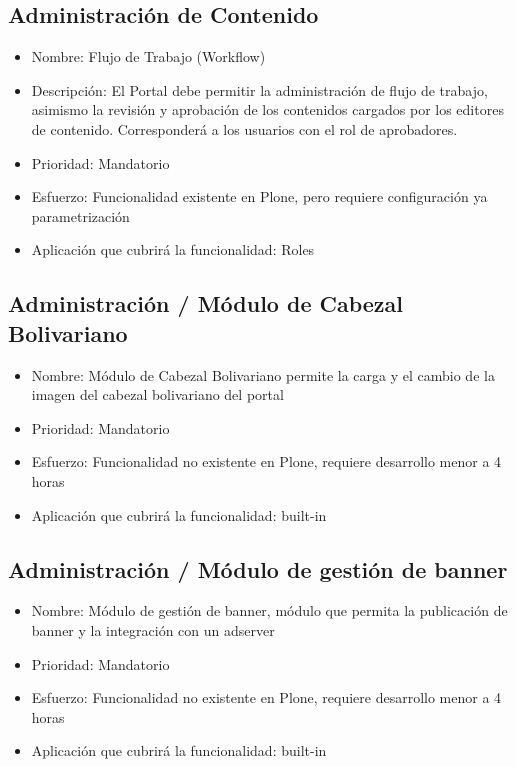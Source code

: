 \documentclass[11pt, letterpaper, oneside, spanish]{scrbook}
\begin{document}
\subsection{Administración de Contenido}
\label{sec-2-1-12}

\begin{itemize}
\item Nombre: Flujo de Trabajo (Workflow)
\item Descripción: El Portal debe permitir la administración de flujo de trabajo,
  asimismo la revisión y aprobación de los contenidos cargados por los
  editores de contenido. Corresponderá a los usuarios con el rol de
  aprobadores.
\item Prioridad: Mandatorio
\item Esfuerzo: Funcionalidad existente en Plone, pero requiere configuración ya
  parametrización
\item Aplicación que cubrirá la funcionalidad: Roles
\end{itemize}
\subsection{Administración / Módulo de Cabezal Bolivariano}
\label{sec-2-1-13}

\begin{itemize}
\item Nombre: Módulo de Cabezal Bolivariano permite la carga y el cambio de la
  imagen del cabezal bolivariano del portal
\item Prioridad: Mandatorio
\item Esfuerzo: Funcionalidad no existente en Plone, requiere desarrollo menor a 4
  horas
\item Aplicación que cubrirá la funcionalidad:  built-in
\end{itemize}
\subsection{Administración / Módulo de gestión de banner}
\label{sec-2-1-14}

\begin{itemize}
\item Nombre: Módulo de gestión de banner, módulo que permita la publicación de
  banner y la integración con un adserver
\item Prioridad: Mandatorio
\item Esfuerzo: Funcionalidad no existente en Plone, requiere desarrollo menor a 4
  horas
\item Aplicación que cubrirá la funcionalidad:  built-in
\end{itemize}
\end{document}

